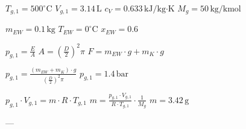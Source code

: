 \( T_{g,1} = 500^\circ \text{C} \)  
\( V_{g,1} = 3.14 \, \text{L} \)  
\( c_V = 0.633 \, \text{kJ/kg·K} \)  
\( M_g = 50 \, \text{kg/kmol} \)  

\( m_{EW} = 0.1 \, \text{kg} \)  
\( T_{EW} = 0^\circ \text{C} \)  
\( x_{EW} = 0.6 \)  

\( p_{g,1} = \frac{E}{A} \)  
\( A = \left( \frac{D}{2} \right)^2 \pi \)  
\( F = m_{EW} \cdot g + m_K \cdot g \)  

\( p_{g,1} = \frac{(m_{EW} + m_K) \cdot g}{\left( \frac{D}{2} \right)^2 \pi} \)  
\( p_{g,1} = 1.4 \, \text{bar} \)  

\( p_{g,1} \cdot V_{g,1} = m \cdot R \cdot T_{g,1} \)  
\( m = \frac{p_{g,1} \cdot V_{g,1}}{R \cdot T_{g,1}} \cdot \frac{1}{M_g} \)  
\( m = 3.42 \, \text{g} \)  

---